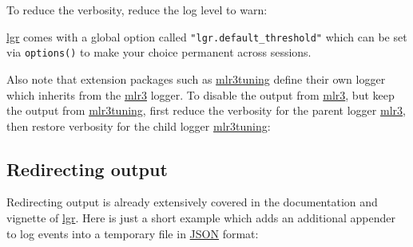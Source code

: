 \documentclass[]{scrbook}
\newenvironment{Shaded}{\begin{snugshade}}{\end{snugshade}}
\newcommand{\KeywordTok}[1]{\textcolor[rgb]{0.13,0.29,0.53}{\textbf{#1}}}
\newcommand{\NormalTok}[1]{#1}
\newcommand{\OperatorTok}[1]{\textcolor[rgb]{0.81,0.36,0.00}{\textbf{#1}}}
\newcommand{\StringTok}[1]{\textcolor[rgb]{0.31,0.60,0.02}{#1}}
\renewenvironment{Shaded} {\begin{snugshade}\small} {\end{snugshade}}
\begin{document}
To reduce the verbosity, reduce the log level to warn:

\begin{Shaded}
\end{Shaded}

\href{https://cran.r-project.org/package=lgr}{lgr} comes with a global option called \texttt{"lgr.default\_threshold"} which can be set via \texttt{options()} to make your choice permanent across sessions.

Also note that extension packages such as \href{https://mlr3tuning.mlr-org.com}{mlr3tuning} define their own logger which inherits from the \href{https://mlr3.mlr-org.com}{mlr3} logger.
To disable the output from \href{https://mlr3.mlr-org.com}{mlr3}, but keep the output from \href{https://mlr3tuning.mlr-org.com}{mlr3tuning}, first reduce the verbosity for the parent logger \href{https://mlr3.mlr-org.com}{mlr3}, then restore verbosity for the child logger \href{https://mlr3tuning.mlr-org.com}{mlr3tuning}:

\begin{Shaded}
\end{Shaded}

\hypertarget{redirecting-output}{%
\subsection{Redirecting output}\label{redirecting-output}}

Redirecting output is already extensively covered in the documentation and vignette of \href{https://cran.r-project.org/package=lgr}{lgr}.
Here is just a short example which adds an additional appender to log events into a temporary file in \href{https://en.wikipedia.org/wiki/JSON}{JSON} format:
\end{document}
